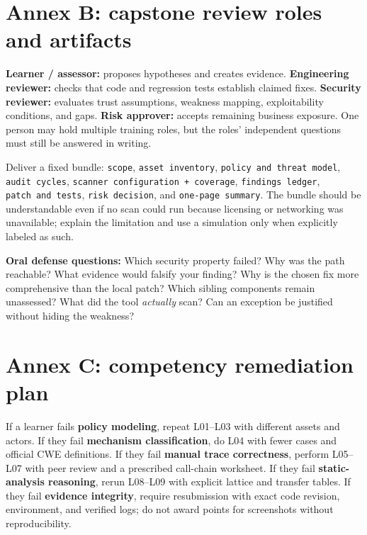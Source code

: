 \documentclass[
  letterpaper,
]{article}
\begin{document}
\section{Annex B: capstone review roles and
artifacts}\label{annex-b-capstone-review-roles-and-artifacts}

\textbf{Learner / assessor:} proposes hypotheses and creates evidence.
\textbf{Engineering reviewer:} checks that code and regression tests
establish claimed fixes. \textbf{Security reviewer:} evaluates trust
assumptions, weakness mapping, exploitability conditions, and gaps.
\textbf{Risk approver:} accepts remaining business exposure. One person
may hold multiple training roles, but the roles' independent questions
must still be answered in writing.

Deliver a fixed bundle: \texttt{scope}, \texttt{asset\ inventory},
\texttt{policy\ and\ threat\ model}, \texttt{audit\ cycles},
\texttt{scanner\ configuration\ +\ coverage}, \texttt{findings\ ledger},
\texttt{patch\ and\ tests}, \texttt{risk\ decision}, and
\texttt{one-page\ summary}. The bundle should be understandable even if
no scan could run because licensing or networking was unavailable;
explain the limitation and use a simulation only when explicitly labeled
as such.

\textbf{Oral defense questions:} Which security property failed? Why was
the path reachable? What evidence would falsify your finding? Why is the
chosen fix more comprehensive than the local patch? Which sibling
components remain unassessed? What did the tool \emph{actually} scan?
Can an exception be justified without hiding the weakness?

\section{Annex C: competency remediation
plan}\label{annex-c-competency-remediation-plan}

If a learner fails \textbf{policy modeling}, repeat L01--L03 with
different assets and actors. If they fail \textbf{mechanism
classification}, do L04 with fewer cases and official CWE definitions.
If they fail \textbf{manual trace correctness}, perform L05--L07 with
peer review and a prescribed call-chain worksheet. If they fail
\textbf{static-analysis reasoning}, rerun L08--L09 with explicit lattice
and transfer tables. If they fail \textbf{evidence integrity}, require
resubmission with exact code revision, environment, and verified logs;
do not award points for screenshots without reproducibility.
\end{document}

